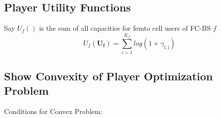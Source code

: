 \documentclass[12pt]{article}
\begin{document}
\subsection{Player Utility Functions}

Say $U_f() $ is the sum of all capacities for femto cell users of FC-BS $f$ 
\begin{displaymath}
U_f(\mathbf{U_f}) = \sum^{K_f}_{i=1} log(1+\gamma_{\mathrm{f,i}})
\end{displaymath}

\subsection{Show Convexity of Player Optimization Problem}

Conditions for Convex Problem:
\end{document}
